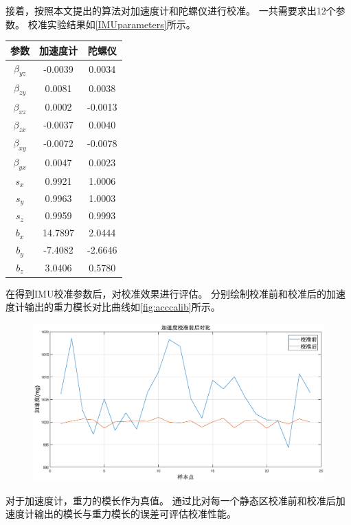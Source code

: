 \documentclass[
  type=master
]{gdutthesis}
\begin{document}
接着，按照本文提出的算法对加速度计和陀螺仪进行校准。
一共需要求出12个参数。
校准实验结果如\autoref{IMUparameters}所示。
\begin{table}[H]
	\label{IMUparameters}
	\begin{tabular}{ccc}
		\toprule
		参数 & 加速度计 & 陀螺仪 \\
		\midrule
		$\beta_{yz}$ & -0.0039 & 0.0034\\
		$\beta_{zy}$ & 0.0081 & 0.0038\\
		$\beta_{xz}$ & 0.0002 & -0.0013\\
		$\beta_{zx}$ & -0.0037 & 0.0040\\
		$\beta_{xy}$ & -0.0072 & -0.0078\\
		$\beta_{yx}$ & 0.0047 & 0.0023\\
		$s_x$ & 0.9921 & 1.0006\\
		$s_y$ & 0.9963 & 1.0003\\
		$s_z$ & 0.9959 & 0.9993\\
		$b_x$ & 14.7897 & 2.0444\\
		$b_y$ & -7.4082 & -2.6646\\
		$b_z$ & 3.0406 & 0.5780\\
		\bottomrule
	\end{tabular}
\end{table}
在得到IMU校准参数后，对校准效果进行评估。
分别绘制校准前和校准后的加速度计输出的重力模长对比曲线如\autoref{fig:acccalib}所示。
\begin{figure}[H]
	\centering
	\includegraphics[width=1.0\textwidth]{acccalib1.eps}
	\label{fig:acccalib}
\end{figure}
对于加速度计，重力的模长作为真值。
通过比对每一个静态区校准前和校准后加速度计输出的模长与重力模长的误差可评估校准性能。
\end{document}
